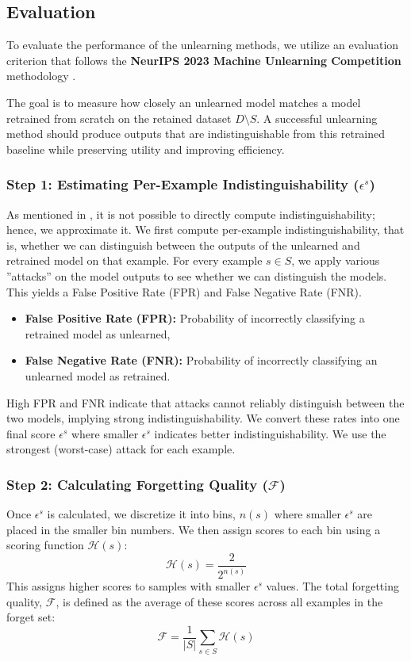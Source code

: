 \documentclass{article}
\begin{document}
\subsection{Evaluation}\label{subsec:evaluation}
To evaluate the performance of the unlearning methods, we utilize an evaluation criterion that follows the \textbf{NeurIPS 2023 Machine Unlearning Competition} methodology \citep{neurips-2023-machine-unlearning}.

The goal is to measure how closely an unlearned model matches a model retrained from scratch on the retained dataset $D \setminus S$. A successful unlearning method should produce outputs that are indistinguishable from this retrained baseline while preserving utility and improving efficiency.



\subsubsection*{Step 1: Estimating Per-Example Indistinguishability ($\epsilon^s$)}

As mentioned in , it is not possible to directly compute indistinguishability; hence, we approximate it. We first compute per-example indistinguishability, that is, whether we can distinguish between the outputs of the unlearned and retrained model on that example. For every example $s \in S$, we apply various ''attacks'' on the model outputs to see whether we can distinguish the models. This yields a False Positive Rate (FPR) and False Negative Rate (FNR). 
\begin{itemize}
    \item \textbf{False Positive Rate (FPR):} Probability of incorrectly classifying a retrained model as unlearned,
    \item \textbf{False Negative Rate (FNR):} Probability of incorrectly classifying an unlearned model as retrained.
\end{itemize}
High FPR and FNR indicate that attacks cannot reliably distinguish between the two models, implying strong indistinguishability. We convert these rates into one final score $\epsilon^s$ where smaller $\epsilon^s$ indicates better indistinguishability. We use the strongest (worst-case) attack for each example.


\subsubsection*{Step 2: Calculating Forgetting Quality ($\mathcal{F}$)}
Once $\epsilon^s$ is calculated, we discretize it into bins, $n(s)$ where smaller $\epsilon^s$ are placed in the smaller bin numbers. We then assign scores to each bin using a scoring function $\mathcal{H}(s)$:
\begin{equation}
    \mathcal{H}(s) = \frac{2}{2^{n(s)}}
\end{equation}
This assigns higher scores to samples with smaller $\epsilon^s$ values. The total forgetting quality, $\mathcal{F}$, is defined as the average of these scores across all examples in the forget set:
\begin{equation}
    \mathcal{F} = \frac{1}{|S|} \sum_{s \in S} \mathcal{H}(s)
\end{equation}
\end{document}

